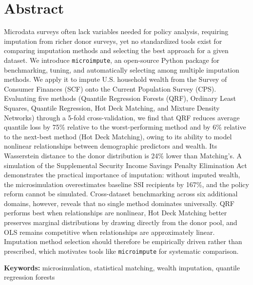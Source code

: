 \section*{Abstract}

Microdata surveys often lack variables needed for policy analysis, requiring imputation from richer donor surveys, yet no standardized tools exist for comparing imputation methods and selecting the best approach for a given dataset. We introduce \texttt{microimpute}, an open-source Python package for benchmarking, tuning, and automatically selecting among multiple imputation methods. We apply it to impute U.S. household wealth from the Survey of Consumer Finances (SCF) onto the Current Population Survey (CPS). Evaluating five methods (Quantile Regression Forests (QRF), Ordinary Least Squares, Quantile Regression, Hot Deck Matching, and Mixture Density Networks) through a 5-fold cross-validation, we find that QRF reduces average quantile loss by 75\% relative to the worst-performing method and by 6\% relative to the next-best method (Hot Deck Matching), owing to its ability to model nonlinear relationships between demographic predictors and wealth. Its Wasserstein distance to the donor distribution is 24\% lower than Matching's. A simulation of the Supplemental Security Income Savings Penalty Elimination Act demonstrates the practical importance of imputation: without imputed wealth, the microsimulation overestimates baseline SSI recipients by 167\%, and the policy reform cannot be simulated. Cross-dataset benchmarking across six additional domains, however, reveals that no single method dominates universally. QRF performs best when relationships are nonlinear, Hot Deck Matching better preserves marginal distributions by drawing directly from the donor pool, and OLS remains competitive when relationships are approximately linear. Imputation method selection should therefore be empirically driven rather than prescribed, which motivates tools like \texttt{microimpute} for systematic comparison.

\vspace{1em}
\noindent\textbf{Keywords:} microsimulation, statistical matching, wealth imputation, quantile regression forests